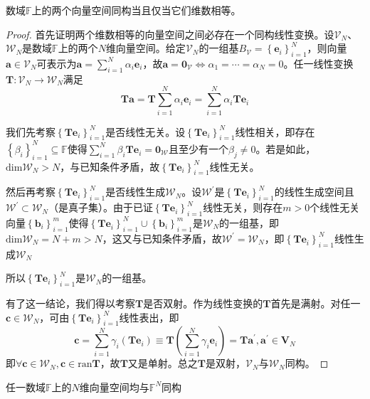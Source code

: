 \documentclass[main.tex]{subfiles}
\begin{document}
\begin{theorem}\label{thm:II.4.6}
数域$\mathbb{F}$上的两个向量空间同构当且仅当它们维数相等。
\end{theorem}
\begin{proof}
首先证明两个维数相等的向量空间之间必存在一个同构线性变换。设$\mathcal{V}_N$、$\mathcal{W}_N$是数域$\mathbb{F}$上的两个$N$维向量空间。给定$\mathcal{V}_N$的一组基$B_\mathcal{V}=\left\{\mathbf{e}_i\right\}_{i=1}^N$，则向量$\mathbf{a}\in\mathcal{V}_N$可表示为$\mathbf{a}=\sum_{i=1}^N\alpha_i\mathbf{e}_i$，故$\mathbf{a}=\mathbf{0}_\mathcal{V}\Leftrightarrow\alpha_1=\cdots=\alpha_N=0$。任一线性变换$\mathbf{T}:\mathcal{V}_N\rightarrow\mathcal{W}_N$满足
\[\mathbf{Ta}=\mathbf{T}\sum_{i=1}^N\alpha_i\mathbf{e}_i=\sum_{i=1}^N\alpha_i\mathbf{Te}_i\]

我们先考察$\left\{\mathbf{Te}_i\right\}_{i=1}^N$是否线性无关。设$\left\{\mathbf{Te}_i\right\}_{i=1}^N$线性相关，即存在$\left\{\beta_i\right\}_{i=1}^N\subseteq\mathbb{F}$使得$\sum_{i=1}^N\beta_i\mathbf{Te}_i=\mathbf{0}_\mathcal{W}$且至少有一个$\beta_j\neq0$。若是如此，$\mathrm{dim}\mathcal{W}_N>N$，与已知条件矛盾，故$\left\{\mathbf{Te}_i\right\}_{i=1}^N$线性无关。

然后再考察$\left\{\mathbf{Te}_i\right\}_{i=1}^N$是否线性生成$\mathcal{W}_N$。设$\mathcal{W}^\prime$是$\left\{\mathbf{Te}_i\right\}_{i=1}^N$的线性生成空间且$\mathcal{W}^\prime\subset\mathcal{W}_N$（是真子集）。由于已证$\left\{\mathbf{Te}_i\right\}_{i=1}^N$线性无关，则存在$m>0$个线性无关向量$\left\{\mathbf{b}_i\right\}_{i=1}^m$使得$\left\{\mathbf{Te}_i\right\}_{i=1}^N\cup\left\{\mathbf{b}_i\right\}_{i=1}^m$是$\mathcal{W}_N$的一组基，即$\mathrm{dim}\mathcal{W}_N=N+m>N$，这又与已知条件矛盾，故$\mathcal{W}^\prime=\mathcal{W}_N$，即$\left\{\mathbf{Te}_i\right\}_{i=1}^N$线性生成$\mathcal{W}_N$

所以$\left\{\mathbf{Te}_i\right\}_{i=1}^N$是$\mathcal{W}_N$的一组基。

有了这一结论，我们得以考察$\mathbf{T}$是否双射。作为线性变换的$\mathbf{T}$首先是满射。对任一$\mathbf{c}\in\mathcal{W}_N$，可由$\left\{\mathbf{Te}_i\right\}_{i=1}^N$线性表出，即
\[\mathbf{c}=\sum_{i=1}^N\gamma_i\left(\mathbf{Te}_i\right)\equiv\mathbf{T}\left(\sum_{i=1}^N\gamma_i\mathbf{e}_i\right)=\mathbf{Ta}^\prime,\mathbf{a}^\prime\in\mathbf{V}_N\]
即$\forall\mathbf{c}\in\mathcal{W}_N,\mathbf{c}\in\mathrm{ran}\mathbf{T}$，故$\mathbf{T}$又是单射。总之$\mathbf{T}$是双射，$\mathcal{V}_N$与$\mathcal{W}_N$同构。
\end{proof}

\begin{corollary}
任一数域$\mathbb{F}$上的$N$维向量空间均与$\mathbb{F}^N$同构
\end{corollary}
\end{document}
